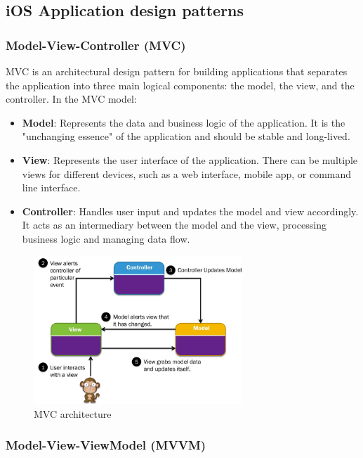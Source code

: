 \subsection{iOS Application design patterns}

\subsubsection{Model-View-Controller (MVC)}

MVC is an architectural design pattern for building applications that separates the application into three main logical components: the model, the view, and the controller. In the MVC model:

\begin{itemize}
    \item \textbf{Model}: Represents the data and business logic of the application. It is the "unchanging essence" of the application and should be stable and long-lived.

    \item \textbf{View}: Represents the user interface of the application. There can be multiple views for different devices, such as a web interface, mobile app, or command line interface.

    \item \textbf{Controller}: Handles user input and updates the model and view accordingly. It acts as an intermediary between the model and the view, processing business logic and managing data flow.
\end{itemize}

\begin{figure}[H]
    \centering
    \includegraphics[width=0.7\textwidth]{assets/images/Research/System/MVC.png}
    \caption{MVC architecture}
    \label{fig:mvc}
\end{figure}

\subsubsection{Model-View-ViewModel (MVVM)}

